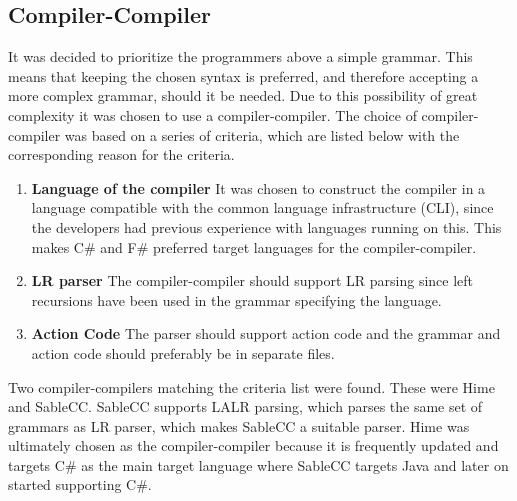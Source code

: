 \subsection{Compiler-Compiler}
\label{sec:compiler_compiler_choice}

It was decided to prioritize the programmers above a simple grammar. This means that keeping the chosen syntax is preferred, and therefore accepting a more complex grammar, should it be needed. Due to this possibility of great complexity it was chosen to use a compiler-compiler. The choice of compiler-compiler was based on a series of criteria, which are listed below with the corresponding reason for the criteria.

\begin{enumerate}
\item \textbf{Language of the compiler} It was chosen to construct the compiler in a language compatible with the common language infrastructure (CLI), since the developers had previous experience with languages running on this. This makes C\# and F\# preferred target languages for the compiler-compiler.

\item \textbf{LR parser} The compiler-compiler should support LR parsing since left recursions have been used in the grammar specifying the language.\\

\item \textbf{Action Code} The parser should support action code and the grammar and action code should preferably be in separate files.\\

\end{enumerate}

Two compiler-compilers matching the criteria list were found. These were Hime and SableCC. SableCC supports LALR parsing, which parses the same set of grammars as LR parser, which makes SableCC a suitable parser. Hime was ultimately chosen as the compiler-compiler because it is frequently updated and targets C\# as the main target language where SableCC targets Java and later on started supporting C\#.
